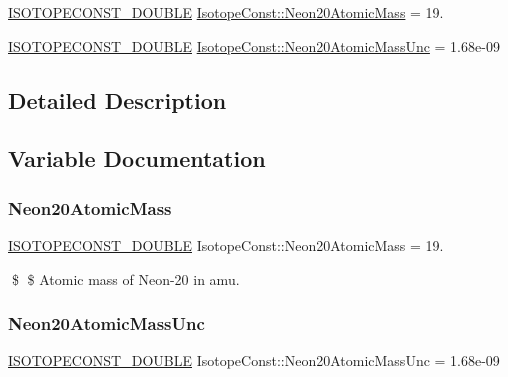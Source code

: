\begin{DoxyCompactItemize}
\item 
\mbox{\hyperlink{group___isotope_const-_macros_ga8f45a7272ce02c0b4c65c44636ed719a}{I\+S\+O\+T\+O\+P\+E\+C\+O\+N\+S\+T\+\_\+\+D\+O\+U\+B\+LE}} \mbox{\hyperlink{group___isotope_const-_neon-_ne20_gaad00f818aea6131d16851fb2b0a55e6a}{Isotope\+Const\+::\+Neon20\+Atomic\+Mass}} = 19.
\item 
\mbox{\hyperlink{group___isotope_const-_macros_ga8f45a7272ce02c0b4c65c44636ed719a}{I\+S\+O\+T\+O\+P\+E\+C\+O\+N\+S\+T\+\_\+\+D\+O\+U\+B\+LE}} \mbox{\hyperlink{group___isotope_const-_neon-_ne20_ga7e0c736d39d909ff97424b024f60aea5}{Isotope\+Const\+::\+Neon20\+Atomic\+Mass\+Unc}} = 1.\+68e-\/09
\end{DoxyCompactItemize}


\subsection{Detailed Description}


\subsection{Variable Documentation}
\mbox{\label{group___isotope_const-_neon-_ne20_gaad00f818aea6131d16851fb2b0a55e6a}} 
\subsubsection{\texorpdfstring{Neon20\+Atomic\+Mass}{Neon20AtomicMass}}
{\footnotesize\ttfamily \mbox{\hyperlink{group___isotope_const-_macros_ga8f45a7272ce02c0b4c65c44636ed719a}{I\+S\+O\+T\+O\+P\+E\+C\+O\+N\+S\+T\+\_\+\+D\+O\+U\+B\+LE}} Isotope\+Const\+::\+Neon20\+Atomic\+Mass = 19.}

\$ \$ Atomic mass of Neon-\/20 in amu. \mbox{\label{group___isotope_const-_neon-_ne20_ga7e0c736d39d909ff97424b024f60aea5}} 
\subsubsection{\texorpdfstring{Neon20\+Atomic\+Mass\+Unc}{Neon20AtomicMassUnc}}
{\footnotesize\ttfamily \mbox{\hyperlink{group___isotope_const-_macros_ga8f45a7272ce02c0b4c65c44636ed719a}{I\+S\+O\+T\+O\+P\+E\+C\+O\+N\+S\+T\+\_\+\+D\+O\+U\+B\+LE}} Isotope\+Const\+::\+Neon20\+Atomic\+Mass\+Unc = 1.\+68e-\/09}


